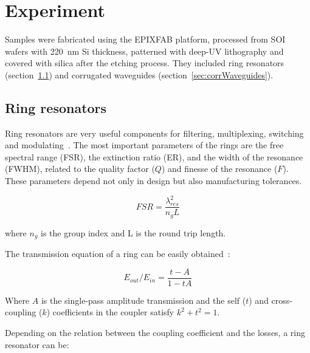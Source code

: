 \documentclass[journal]{IEEEtran}
\begin{document}
\section{Experiment}
Samples were fabricated using the EPIXFAB platform, processed from SOI wafers with 220~nm Si thickness, patterned with deep-UV lithography and covered with silica after the etching process. They included ring resonators (section~\ref{sec:ringResonators}) and corrugated waveguides (section~\ref{sec:corrWaveguides}).


\subsection {Ring resonators}
\label{sec:ringResonators}
Ring resonators are very useful components for filtering, multiplexing, switching and modulating~\cite{Bogaerts:12}. The most important parameters of the rings are the free spectral range (FSR), the extinction ratio (ER), and the width of the resonance (FWHM), related to the quality factor ($Q$) and finesse of the resonance ($F$). These parameters depend not only in design but also manufacturing tolerances.


\begin{equation}
	FSR=\frac{\lambda_{res}^2}{n_gL}
	\label{eq:FSRanillo}
\end{equation} 

where $n_g$ is the group index and L is the round trip length.

The transmission equation of a ring can be easily obtained~\cite{McKinnon2009}:

\begin{equation}
	E_{out}/E_{in}=\frac{t-A}{1-tA}
\label{eq:transmissionRing}
\end{equation}

Where $A$ is the single-pass amplitude transmission and the self ($t$) and cross-coupling ($k$) coefficients in the coupler satisfy $k^2+t^2=1$.



Depending on the relation between the coupling coefficient and the losses, a ring resonator can be:
\end{document}
